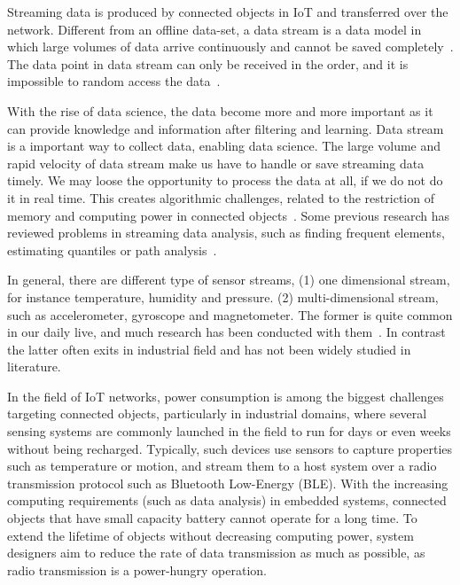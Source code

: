 Streaming data is produced by connected objects in IoT and transferred over
the network. Different from an offline data-set, a data stream is a data
model in which large volumes of data arrive continuously and cannot be
saved completely~\cite{o2002streaming}. The data point in data stream can
only be received in the order, and it is impossible to random access the
data~\cite{o2002streaming}.

With the rise of data science, the data become more and more important as it can
provide knowledge and information after filtering and learning. Data stream is a
important way to collect data, enabling data science. The large volume and rapid
velocity of data stream make us have to handle or save streaming data timely. We
may loose the opportunity to process the data at all, if we do not do it in real
time. This creates algorithmic challenges, related to the restriction of memory
and computing power in connected objects~\cite{o2002streaming}. Some previous
research has reviewed problems in streaming data analysis, such as finding
frequent elements, estimating quantiles or path
analysis~\cite{kejariwal2015real}.

In general, there are different type of sensor streams, (1) one dimensional
stream, for instance temperature, humidity and pressure. (2) multi-dimensional
stream, such as accelerometer, gyroscope and magnetometer. The former is quite
common in our daily live, and much research has been conducted with
them~\cite{kulwicki1991humidity, oprea2009temperature, woyessa2016temperature}.
In contrast the latter often exits in industrial field and has not been widely
studied in literature.





In the field of IoT networks, power consumption is among the biggest challenges
targeting connected objects, particularly in industrial domains, where
several sensing systems are commonly launched in the field to run for days or
even weeks without being recharged. Typically, such devices use sensors to
capture properties such as temperature or motion, and stream them to a host
system over a radio transmission protocol such as Bluetooth Low-Energy (BLE).
With the increasing computing requirements (such as data analysis) in embedded
systems, connected objects that have small capacity
battery cannot operate for a long time. To extend the lifetime of objects without
decreasing computing power, system designers aim to reduce the rate of data
transmission as much as possible, as radio transmission is a power-hungry
operation.


